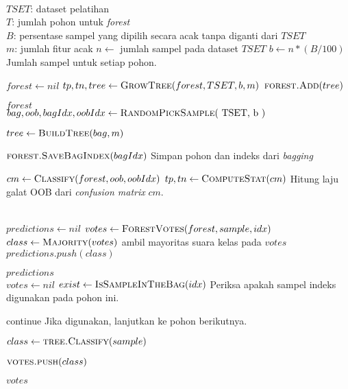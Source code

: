 \begin{center}
\label{alg:rf}
	\begin{algorithmic}[1]
\Require \\
$ TSET $: dataset pelatihan \\
$ T $: jumlah pohon untuk \textit{forest} \\
$ B $: persentase sampel yang dipilih secara acak tanpa diganti dari $TSET$ \\
$ m $: jumlah fitur acak
\pagebreak
{}
	\State $ n \gets $ jumlah sampel pada dataset $ TSET $
	\State $ b \gets n * (B / 100) $
	\Comment Jumlah sampel untuk setiap pohon.

	\State $ forest \gets nil $
		\State $ tp, tn, tree \gets \Call{GrowTree}{forest, TSET, b, m} $
		\State $ \Call{forest.Add}{tree} $
	\EndFor
	
	\State \Return $forest$
\EndFunction
\\
	\label{bagging}
	\State $ bag, oob, bagIdx, oobIdx \gets \Call{RandomPickSample}{$ TSET,
	b $} $

	\State $ tree \gets \Call{BuildTree}{bag, m} $

	\State $ \Call{forest.SaveBagIndex}{bagIdx} $
	\Comment Simpan pohon dan indeks dari \textit{bagging}

	\State $ cm \gets \Call{Classify}{forest, oob, oobIdx} $
	\State $ tp, tn \gets \Call{ComputeStat}{cm} $
	\Comment Hitung laju galat OOB dari \textit{confusion matrix}
	$cm$.

	\State {}
\EndFunction
\\
	\State $ predictions \gets nil $
		\State $ votes \gets \Call{ForestVotes}{forest, sample, idx} $
		\State $ class \gets \Call{Majority}{votes} $
		\Comment ambil mayoritas suara kelas pada $votes$
		\State $ predictions.push(class) $
	\EndFor

	\State \Return $predictions$
\EndFunction
\\
	\State $ votes \gets nil $
		\State $ exist \gets \Call{IsSampleInTheBag}{idx} $
		\Comment Periksa apakah sampel indeks digunakan pada pohon ini.

			\State continue
			\Comment Jika digunakan, lanjutkan ke pohon berikutnya.
		\EndIf

		\State $ class \gets \Call{tree.Classify}{sample} $

		\State $ \Call{votes.push}{class} $
	\EndFor

	\State \Return $ votes $
\EndFunction
	\end{algorithmic}
\end{center}
